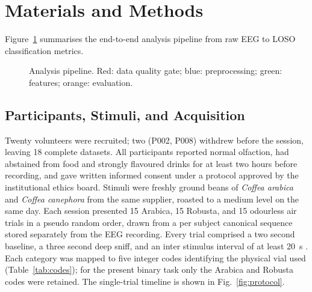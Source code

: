 \documentclass[conference]{IEEEtran}
\begin{document}
\section{Materials and Methods}

Figure~\ref{fig:pipeline} summarises the end-to-end analysis pipeline from raw EEG to LOSO classification metrics.

\begin{figure}[ht]
  \centering
  \caption{Analysis pipeline. Red: data quality gate; blue: preprocessing; green: features; orange: evaluation.}
  \label{fig:pipeline}
\end{figure}

\subsection{Participants, Stimuli, and Acquisition}
Twenty volunteers were recruited; two (P002, P008) withdrew before the session, leaving 18 complete datasets. All participants reported normal olfaction, had abstained from food and strongly flavoured drinks for at least two hours before recording, and gave written informed consent under a protocol approved by the institutional ethics board. Stimuli were freshly ground beans of \textit{Coffea arabica} and \textit{Coffea canephora} from the same supplier, roasted to a medium level on the same day. Each session presented 15 Arabica, 15 Robusta, and 15 odourless air trials in a pseudo random order, drawn from a per subject canonical sequence stored separately from the EEG recording. Every trial comprised a two second baseline, a three second deep sniff, and an inter stimulus interval of at least 20~s \cite{kroupi2014,kobal1981}. Each category was mapped to five integer codes identifying the physical vial used (Table~\ref{tab:codes}); for the present binary task only the Arabica and Robusta codes were retained. The single-trial timeline is shown in Fig.~\ref{fig:protocol}.
\end{document}
